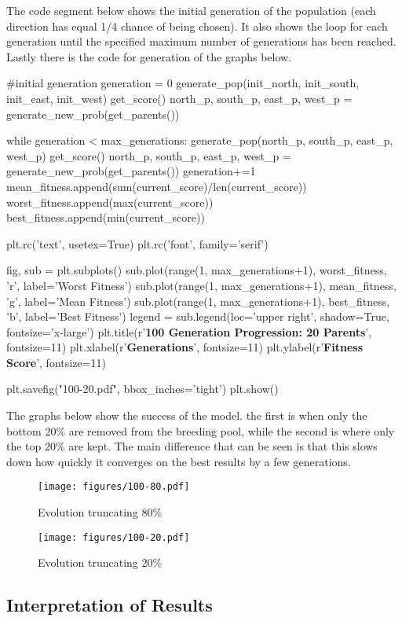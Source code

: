 \documentclass{article}
\begin{document}
The code segment below shows the initial generation of the population (each direction has equal 1/4 chance of being chosen). It also shows the loop for each generation until the specified maximum number of generations has been reached. Lastly there is the code for generation of the graphs below. 


\begin{python}
#initial generation
generation = 0 
generate_pop(init_north, init_south, init_east, init_west)
get_score()
north_p, south_p, east_p, west_p = generate_new_prob(get_parents())

while generation < max_generations:
	generate_pop(north_p, south_p, east_p, west_p)
	get_score()
	north_p, south_p, east_p, west_p = generate_new_prob(get_parents())
	generation+=1
	mean_fitness.append(sum(current_score)/len(current_score))
	worst_fitness.append(max(current_score))
	best_fitness.append(min(current_score))


plt.rc('text', usetex=True)
plt.rc('font', family='serif')

fig, sub = plt.subplots()
sub.plot(range(1, max_generations+1), worst_fitness, 'r', label='Worst Fitness')
sub.plot(range(1, max_generations+1), mean_fitness, 'g', label='Mean Fitness')
sub.plot(range(1, max_generations+1), best_fitness, 'b', label='Best Fitness')
legend = sub.legend(loc='upper right', shadow=True, fontsize='x-large')
plt.title(r'\textbf{100 Generation Progression: 20 Parents}', fontsize=11)
plt.xlabel(r'\textbf{Generations}', fontsize=11)
plt.ylabel(r'\textbf{Fitness Score}', fontsize=11)


plt.savefig("100-20.pdf", bbox_inches='tight')
plt.show()
\end{python}

The graphs below show the success of the model. the first is when only the bottom 20\% are removed from the breeding pool, while the second is where only the top 20\% are kept. The main difference that can be seen is that this slows down how quickly it converges on the best results by a few generations. 
\begin{figure}[H]
\centering
\texttt{[image: figures/100-80.pdf]}
\caption{Evolution truncating 80\%}
\label{fig:100-80}
\end{figure}
\begin{figure}[H]
\centering
\texttt{[image: figures/100-20.pdf]}
\caption{Evolution truncating 20\%}
\label{fig:100-20}
\end{figure}

\subsection{Interpretation of Results}
\end{document}
